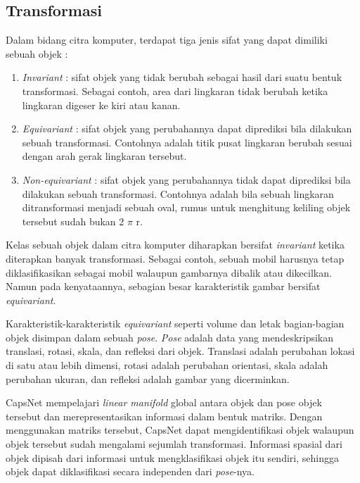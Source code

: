 \documentclass{article}
\begin{document}
   	\subsection{Transformasi}
   	Dalam bidang citra komputer, terdapat tiga jenis sifat yang dapat dimiliki sebuah objek : 
   	
   	\begin{enumerate}
   	 \item \textit{Invariant} : sifat objek yang tidak berubah sebagai hasil dari suatu bentuk transformasi. Sebagai contoh, area dari lingkaran tidak berubah ketika lingkaran digeser ke kiri atau kanan.
   	 \item \textit{Equivariant} : sifat objek yang perubahannya dapat diprediksi bila dilakukan sebuah transformasi. Contohnya adalah titik pusat lingkaran berubah sesuai dengan arah gerak lingkaran tersebut.
   	 \item \textit{Non-equivariant} : sifat objek yang perubahannya tidak dapat diprediksi bila dilakukan sebuah transformasi. Contohnya adalah bila sebuah lingkaran ditransformasi menjadi sebuah oval, rumus untuk menghitung keliling objek tersebut sudah bukan 2 $\pi$ r. 
   	\end{enumerate}
   	
   	\par
   	Kelas sebuah objek dalam citra komputer diharapkan bersifat \textit{invariant} ketika diterapkan banyak transformasi. Sebagai contoh, sebuah mobil harusnya tetap diklasifikasikan sebagai mobil walaupun gambarnya dibalik atau dikecilkan. Namun pada kenyataannya, sebagian besar karakteristik gambar bersifat \textit{equivariant}. \par
   	Karakteristik-karakteristik \textit{equivariant} seperti volume dan letak bagian-bagian objek disimpan dalam sebuah \textit{pose}. \textit{Pose} adalah data yang mendeskripsikan translasi, rotasi, skala, dan refleksi dari objek. Translasi adalah perubahan lokasi di satu atau lebih dimensi, rotasi adalah perubahan orientasi, skala adalah perubahan ukuran, dan refleksi adalah gambar yang dicerminkan. \par
   	CapsNet mempelajari \textit{linear manifold} global antara objek dan pose objek tersebut dan merepresentasikan informasi dalam bentuk matriks. Dengan menggunakan matriks tersebut, CapsNet dapat mengidentifikasi objek walaupun objek tersebut sudah mengalami sejumlah transformasi. Informasi spasial dari objek dipisah dari informasi untuk mengklasifikasi objek itu sendiri, sehingga objek dapat diklasifikasi secara independen dari \textit{pose}-nya.
   	
\end{document}
